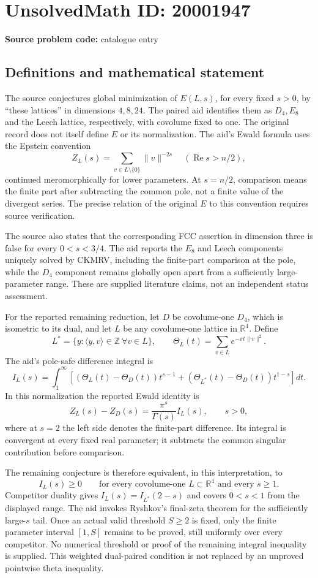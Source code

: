 \documentclass[11pt]{article}
\begin{document}
\section*{UnsolvedMath ID: 20001947}
\textbf{Source problem code:} catalogue entry
\subsection{Definitions and mathematical statement}
The source conjectures global minimization of \(E(L,s)\), for every fixed \(s>0\), by ``these lattices'' in dimensions \(4,8,24\). The paired aid identifies them as \(D_4,E_8\) and the Leech lattice, respectively, with covolume fixed to one. The original record does not itself define \(E\) or its normalization. The aid's Ewald formula uses the Epstein convention
\[
 Z_L(s)=\sum_{v\in L\setminus\{0\}}\|v\|^{-2s}
 \quad(\operatorname{Re}s>n/2),
\]
continued meromorphically for lower parameters. At \(s=n/2\), comparison means the finite part after subtracting the common pole, not a finite value of the divergent series. The precise relation of the original \(E\) to this convention requires source verification.

The source also states that the corresponding FCC assertion in dimension three is false for every \(0<s<3/4\). The aid reports the \(E_8\) and Leech components uniquely solved by CKMRV, including the finite-part comparison at the pole, while the \(D_4\) component remains globally open apart from a sufficiently large-parameter range. These are supplied literature claims, not an independent status assessment.

For the reported remaining reduction, let \(D\) be covolume-one \(D_4\), which is isometric to its dual, and let \(L\) be any covolume-one lattice in \(\mathbb R^4\). Define
\[
 L^*=\{y:\langle y,v\rangle\in\mathbb Z\ \forall v\in L\},\qquad
 \Theta_L(t)=\sum_{v\in L}e^{-\pi t\|v\|^2}.
\]
The aid's pole-safe difference integral is
\[
 I_L(s)=\int_1^\infty\left[
   (\Theta_L(t)-\Theta_D(t))t^{s-1}
  +(\Theta_{L^*}(t)-\Theta_D(t))t^{1-s}\right]dt.
\]
In this normalization the reported Ewald identity is
\[
 Z_L(s)-Z_D(s)=\frac{\pi^s}{\Gamma(s)}I_L(s),\qquad s>0,
\]
where at \(s=2\) the left side denotes the finite-part difference. Its integral is convergent at every fixed real parameter; it subtracts the common singular contribution before comparison.

The remaining conjecture is therefore equivalent, in this interpretation, to
\[
 I_L(s)\geq0\qquad
 \text{for every covolume-one }L\subset\mathbb R^4
 \text{ and every }s\geq1.
\]
Competitor duality gives \(I_L(s)=I_{L^*}(2-s)\) and covers \(0<s<1\) from the displayed range. The aid invokes Ryshkov's final-zeta theorem for the sufficiently large-\(s\) tail. Once an actual valid threshold \(S\geq2\) is fixed, only the finite parameter interval \([1,S]\) remains to be proved, still uniformly over every competitor. No numerical threshold or proof of the remaining integral inequality is supplied. This weighted dual-paired condition is not replaced by an unproved pointwise theta inequality.
\end{document}
